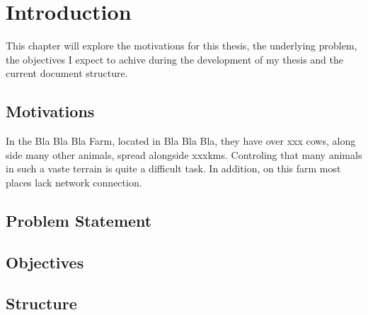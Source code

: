 
%

\chapter{Introduction}
\label{cha:introduction}
\quad This chapter will explore the motivations for this thesis, the underlying
problem, the objectives I expect to achive during the development of my thesis
and the current document structure.

\section{Motivations}
\label{sec:motivations}
\quad In the Bla Bla Bla Farm, located in Bla Bla Bla, they have over xxx cows,
along side many other animals, spread alongside xxxkms. Controling that many animals
in such a vaste terrain is quite a difficult task. In addition, on this farm
most places lack network connection.


\section{Problem Statement}
\label{sec:problem_statement}

\section{Objectives}
\label{sec:objectives}

\section{Structure}
\label{sec:structure}
